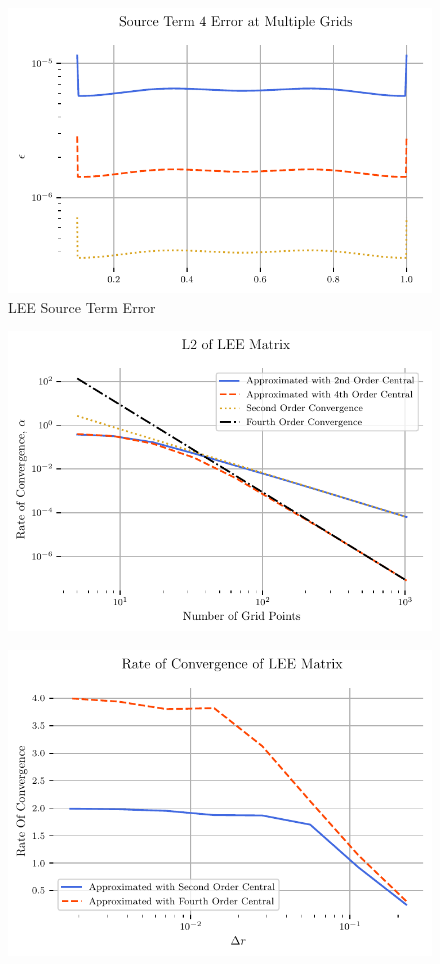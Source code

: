 \begin{figure}[h!]
    \centering
    \includegraphics{../../../CodeRun/04-plotReport/tex-outputs/MMS1_SourceTermError4.pdf}
    \caption{LEE Source Term Error}
    \label{fig:7}
\end{figure}


\begin{figure}[h!]
    \centering
    \includegraphics{../../../CodeRun/04-plotReport/tex-outputs/MMS1_LEE_L2.pdf}
    \label{fig:9}
\end{figure}

\begin{figure}[h!]
    \centering
    \includegraphics{../../../CodeRun/04-plotReport/tex-outputs/MMS1_LEE_ROC.pdf}
    \label{fig:9}
\end{figure}
